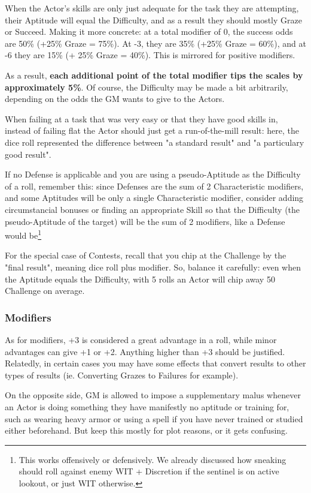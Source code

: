 When the Actor's skills are only just adequate for the task they are attempting, their Aptitude will equal the Difficulty, and as a result they should mostly Graze or Succeed. Making it more concrete: at a total modifier of 0, the success odds are 50\% (+25\% Graze = 75\%). At -3, they are 35\% (+25\% Graze = 60\%), and at -6 they are 15\% (+ 25\% Graze = 40\%). This is mirrored for positive modifiers. 

As a result, \textbf{each additional point of the total modifier tips the scales by approximately 5\%}. Of course, the Difficulty may be made a bit arbitrarily, depending on the odds the GM wants to give to the Actors. 

When failing at a task that was very easy or that they have good skills in, instead of failing flat the Actor should just get a run-of-the-mill result: here, the dice roll represented the difference between "a standard result" and "a particulary good result".

If no Defense is applicable and you are using a pseudo-Aptitude as the Difficulty of a roll, remember this: since Defenses are the sum of 2 Characteristic modifiers, and some Aptitudes will be only a single Characteristic modifier, consider adding circumstancial bonuses or finding an appropriate Skill so that the Difficulty (the pseudo-Aptitude of the target) will be the sum of 2 modifiers, like a Defense would be\footnote{This works offensively or defensively. We already discussed how sneaking should roll against enemy WIT + Discretion if the sentinel is on active lookout, or just WIT otherwise.}

For the special case of Contests, recall that you chip at the Challenge by the "final result", meaning dice roll plus modifier. So, balance it carefully: even when the Aptitude equals the Difficulty, with 5 rolls an Actor will chip away 50 Challenge on average.


\subsubsection{Modifiers}

As for modifiers, +3 is considered a great advantage in a roll, while minor advantages can give +1 or +2. Anything higher than +3 should be justified. Relatedly, in certain cases you may have some effects that convert results to other types of results (ie. Converting Grazes to Failures for example).

On the opposite side, GM is allowed to impose a supplementary malus whenever an Actor is doing something they have manifestly no aptitude or training for, such as wearing heavy armor or using a spell if you have never trained or studied either beforehand. But keep this mostly for plot reasons, or it gets confusing.



